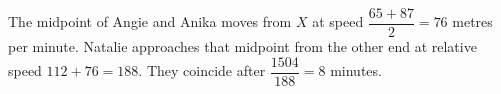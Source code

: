 The midpoint of Angie and Anika moves from $X$ at speed $\dfrac{65+87}{2}=76$ metres per minute. Natalie approaches that midpoint from the other end at relative speed $112+76=188$. They coincide after $\dfrac{1504}{188}=\boxed8$ minutes.
